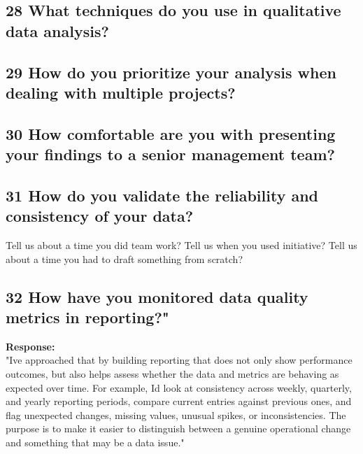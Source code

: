 \documentclass[
  letterpaper,
]{scrbook}
\begin{document}
\subsection{\texorpdfstring{\textbf{28 What techniques do you use in
qualitative data
analysis?}}{28 What techniques do you use in qualitative data analysis?}}\label{what-techniques-do-you-use-in-qualitative-data-analysis}

\subsection{\texorpdfstring{\textbf{29 How do you prioritize your
analysis when dealing with multiple
projects?}}{29 How do you prioritize your analysis when dealing with multiple projects?}}\label{how-do-you-prioritize-your-analysis-when-dealing-with-multiple-projects}

\subsection{\texorpdfstring{\textbf{30 How comfortable are you with
presenting your findings to a senior management
team?}}{30 How comfortable are you with presenting your findings to a senior management team?}}\label{how-comfortable-are-you-with-presenting-your-findings-to-a-senior-management-team}

\subsection{\texorpdfstring{\textbf{31 How do you validate the
reliability and consistency of your
data?}}{31 How do you validate the reliability and consistency of your data?}}\label{how-do-you-validate-the-reliability-and-consistency-of-your-data}

Tell us about a time you did team work? Tell us when you used
initiative? Tell us about a time you had to draft something from
scratch?

\subsection{\texorpdfstring{\textbf{32 How have you monitored data
quality metrics in
reporting?"}}{32 How have you monitored data quality metrics in reporting?"}}\label{how-have-you-monitored-data-quality-metrics-in-reporting}

\textbf{Response:}\\
"I\textquotesingle ve approached that by building reporting that does
not only show performance outcomes, but also helps assess whether the
data and metrics are behaving as expected over time. For example,
I\textquotesingle d look at consistency across weekly, quarterly, and
yearly reporting periods, compare current entries against previous ones,
and flag unexpected changes, missing values, unusual spikes, or
inconsistencies. The purpose is to make it easier to distinguish between
a genuine operational change and something that may be a data issue."
\end{document}
